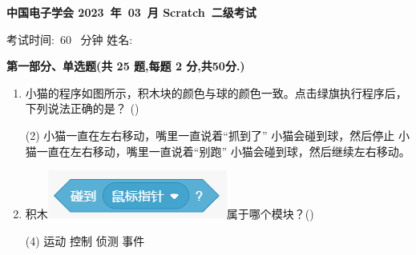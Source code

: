 \documentclass[10pt, a4paper]{article}
\newcommand{\Title}[3]{
    \begin{center}
        \Large \textbf{中国电子学会 #1~年~#2~月 Scratch~#3级考试}
    \end{center}
}
\newcommand{\TimeAndName}[1]{
    \begin{center}
        考试时间:~#1~ 分钟 \qquad\qquad\qquad\qquad 姓名:\underline{\quad\quad\quad\quad}
    \end{center}
}
\newcommand{\hq}{\hfill(\qquad)}
\begin{document}
    \Title{2023}{03}{二} %
    \TimeAndName{60} %

    \vspace{2mm}
    {\noindent\textbf{第一部分、单选题(共 25 题,每题 2 分,共50分.)}}
    \begin{enumerate}
        \item 小猫的程序如图所示，积木块的颜色与球的颜色一致。点击绿旗执行程序后，下列说法正确的是？ \hq
        \begin{tasks}(2)
            \task 小猫一直在左右移动，嘴里一直说着“抓到了”
            \task 小猫会碰到球，然后停止
            \task 小猫一直在左右移动，嘴里一直说着“别跑”
            \task 小猫会碰到球，然后继续左右移动。
        \end{tasks}

        \item 积木\includegraphics[width=.15\textwidth]{figure/2.png}属于哪个模块？\hq
        \begin{tasks}(4)
            \task 运动
            \task 控制
            \task 侦测
            \task 事件
        \end{tasks}


\end{enumerate}
\end{document}
